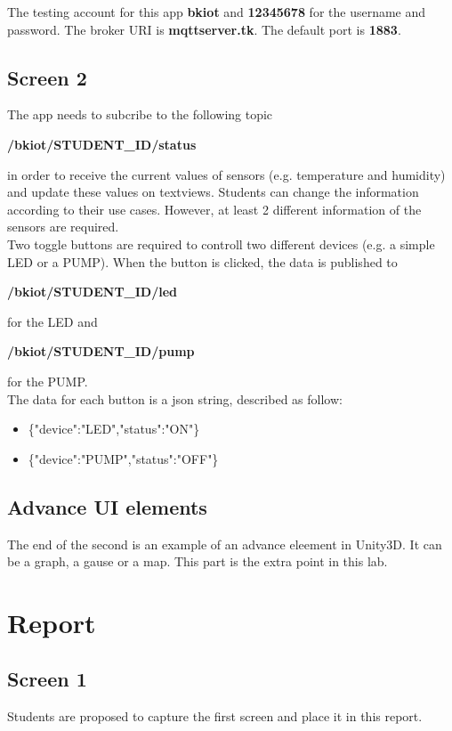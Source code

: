 \documentclass[a4paper,11pt]{article}
\theoremstyle{mytheor}
\begin{document}
The testing account for this app \textbf{bkiot} and \textbf{12345678} for the username and password. The broker URI is \textbf{mqttserver.tk}. The default port is \textbf{1883}.

\subsection{Screen 2}
The app needs to subcribe to the following topic 
\begin{center}
    \textbf{/bkiot/STUDENT\_ID/status} 
    
\end{center}
in order to receive the current values of sensors (e.g. temperature and humidity) and update these values on textviews. Students can change the information according to their use cases. However, at least 2 different information of the sensors are required.\\

Two toggle buttons are required to controll two different devices (e.g. a simple LED or a PUMP). When the button is clicked, the data is published to
\begin{center}
    \textbf{/bkiot/STUDENT\_ID/led} 
\end{center}
for the LED and

\begin{center}
    \textbf{/bkiot/STUDENT\_ID/pump} 
\end{center}
for the PUMP.\\

The data for each button is a json string, described as follow:

\begin{itemize}
    \item {\{"device":"LED","status":"ON"\}}
     \item {\{"device":"PUMP","status":"OFF"\}}
\end{itemize}


\subsection{Advance UI elements}
The end of the second is an example of an advance eleement in Unity3D. It can be a graph, a gause or a map. This part is the extra point in this lab.

\section{Report}
\subsection{Screen 1}
Students are proposed to capture the first screen and place it in this report.
\end{document}
